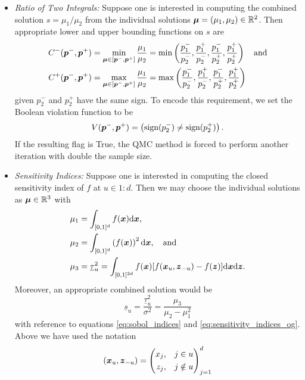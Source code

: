 \documentclass{article}[12pt]
\begin{document}
\begin{itemize}
    \item \emph{Ratio of Two Integrals:} Suppose one is interested in computing the combined solution $s = \mu_1/\mu_2$ from the individual solutions $\boldsymbol{\mu} = (\mu_1,\mu_2) \in \mathbb{R}^2$. Then appropriate lower and upper bounding functions on $s$ are 
    \begin{align*}
        C^-(\boldsymbol{p}^-,\boldsymbol{p}^+) &= \min_{\boldsymbol{\mu} \in [\boldsymbol{p}^-,\boldsymbol{p}^+]} \frac{\mu_1}{\mu_2} = \min\left(\frac{p_1^-}{p_2^-},\frac{p_1^+}{p_2^-},\frac{p_1^-}{p_2^+},\frac{p_1^+}{p_2^+}\right) \quad \text{and}\\
        C^+(\boldsymbol{p}^-,\boldsymbol{p}^+) &= \max_{\boldsymbol{\mu} \in [\boldsymbol{p}^-,\boldsymbol{p}^+]} \frac{\mu_1}{\mu_2} = \max\left(\frac{p_1^-}{p_2^-},\frac{p_1^+}{p_2^-},\frac{p_1^-}{p_2^+},\frac{p_1^+}{p_2^+}\right)
    \end{align*}
    given $p_2^-$ and $p_2^+$ have the same sign. To encode this requirement, we set the Boolean violation function to be 
    $$V(\boldsymbol{p}^-,\boldsymbol{p}^+) = \left(\text{sign}(p_2^-) \neq \text{sign}(p_2^+)\right).$$
    If the resulting flag is True, the QMC method is forced to perform another iteration with double the sample size. 
    \item \emph{Sensitivity Indices:} Suppose one is interested in computing the closed sensitivity index of $f$ at $u \in 1:d$. Then we may choose the individual solutions as $\boldsymbol{\mu} \in \mathbb{R}^3$ with
    \begin{align}
        \mu_1 &= \int_{[0,1]^d} f(\boldsymbol{x})\mathrm{d}\boldsymbol{x} \label{eq:mu1}, \\
        \mu_2 &= \int_{[0,1]^d} \left(f(\boldsymbol{x})\right)^2\mathrm{d}\boldsymbol{x}  \label{eq:mu2}, \quad \text{and} \\
        \mu_3 &= \underline{\tau}_u^2 = \int_{[0,1]^{2d}} f(\boldsymbol{x})[f(\boldsymbol{x}_u,\boldsymbol{z}_{-u})-f(\boldsymbol{z})]\mathrm{d}\boldsymbol{x}\mathrm{d}\boldsymbol{z}. \label{eq:tau_closed}
    \end{align}
    Moreover, an appropriate combined solution would be
    \begin{equation*}
        \label{eq:closed_si}
        \underline{s}_u = \frac{\underline{\tau}_u^2}{\sigma^2} = \frac{\mu_3}{\mu_2-\mu_1^2}
    \end{equation*}
    with reference to equations \eqref{eq:sobol_indices} and \eqref{eq:sensitivity_indices_og}. Above we have used the notation
    \begin{equation}
        (\bx_{u},\bz_{-u}) = \left(\begin{aligned}x_{j}, \quad & j \in u \\ z_{j}, \quad & j \notin u \end{aligned}\right)_{j=1}^d

\end{equation}
\end{itemize}
\end{document}
